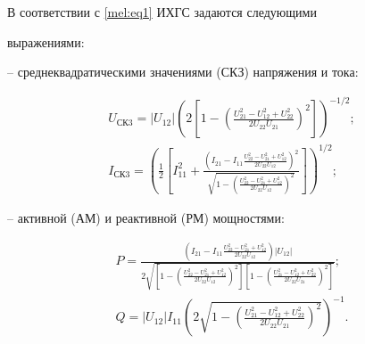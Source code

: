 В соответствии с \eqref{mel:eq1} ИХГС задаются следующими

выражениями:



-- среднеквадратическими значениями (СКЗ) напряжения и тока:

\begin{gather}

\label{mel:eq2}

 U_\text{СК3} ={\left| U_{12} \right|}\left({

{2\left[ {1-\left( {\frac{U_{21}^2 -U_{12}^2 +U_{22}^2 }{2U_{22}

U_{21} }} \right)^2} \right]} }\right)^{-1/2};\\

\label{mel:eq5} I_\text{СК3} =\left( {\frac{1}{2}\left[ {I_{11}^2

+\frac{\left( {I_{21} -I_{11} \frac{U_{22}^2 -U_{21}^2 +U_{12}^2

}{2U_{22} U_{12} }} \right)^2}{\sqrt {1-\left( {\frac{U_{22}^2

-U_{21}^2 +U_{12}^2 }{2U_{22} U_{12} }} \right)^2} }} \right]}

\right)^{{1}/{2}};

\end{gather}



-- активной (АМ) и реактивной (РМ) мощностями:

\begin{gather}

\label{mel:eq5} P=\frac{\left( {I_{21} -I_{11} \frac{U_{22}^2

-U_{21}^2 +U_{12}^2 }{2U_{22} U_{12} }} \right)\left| {U_{12} }

\right|}{2\sqrt {\left[ {1-\left( {\frac{U_{22}^2 -U_{21}^2

+U_{12}^2 }{2U_{22} U_{12} }} \right)^2} \right]\left[ {1-\left(

{\frac{U_{21}^2 -U_{12}^2 +U_{22}^2 }{2U_{22} U_{21} }} \right)^2}

\right]} };\\

\label{mel:eq5} Q={\left| {U_{12} } \right|I_{11} } \left( {2\sqrt

{1-\left( {\frac{U_{21}^2 -U_{12}^2 +U_{22}^2 }{2U_{22} U_{21} }}

\right)^2} }\right)^{-1}.

\end{gather}




